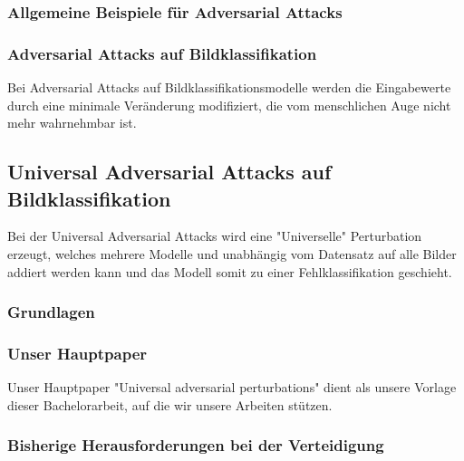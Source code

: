 \subsubsection{Allgemeine Beispiele für Adversarial Attacks} 


\subsubsection{Adversarial Attacks auf Bildklassifikation} 

Bei Adversarial Attacks auf Bildklassifikationsmodelle werden die Eingabewerte durch eine minimale Veränderung modifiziert, die vom menschlichen Auge nicht mehr wahrnehmbar ist.

\subsection{Universal Adversarial Attacks auf Bildklassifikation} 

Bei der Universal Adversarial Attacks wird eine "Universelle" Perturbation erzeugt, welches mehrere Modelle und unabhängig vom Datensatz auf alle Bilder addiert werden kann und das Modell somit zu einer Fehlklassifikation geschieht. 

\subsubsection{Grundlagen}

\subsubsection{Unser Hauptpaper}

Unser Hauptpaper "Universal adversarial perturbations" \cite{moosavi-dezfooli_universal_2017} dient als unsere Vorlage dieser Bachelorarbeit, auf die wir unsere Arbeiten stützen. 

\subsubsection{Bisherige Herausforderungen bei der Verteidigung}

